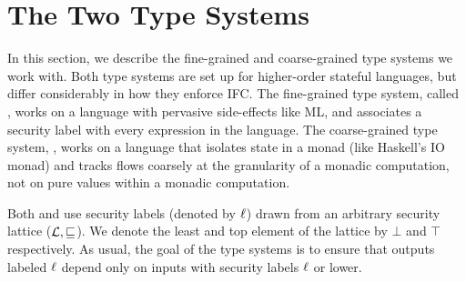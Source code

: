\section{The Two Type Systems}
\label{sec:ts}

In this section, we describe the fine-grained and coarse-grained type
systems we work with. Both type systems are set up for higher-order
stateful languages, but differ considerably in how they enforce
IFC. The fine-grained type system, called {\fg}, works on a language
with pervasive side-effects like ML, and associates a security label
with every expression in the language. The coarse-grained type system,
{\cg}, works on a language that isolates state in a monad (like
Haskell's IO monad) and tracks flows coarsely at the granularity of a
monadic computation, not on pure values within a monadic computation.


Both {\fg} and {\cg} use security labels (denoted by $\ell$) drawn
from an arbitrary security lattice ($\mathcal{L}, \sqsubseteq$). We denote
the least and top element of the lattice by $\bot$ and $\top$
respectively. As usual, the goal of the type systems is to ensure that
outputs labeled $\ell$ depend only on inputs with security labels
$\ell$ or lower. 





